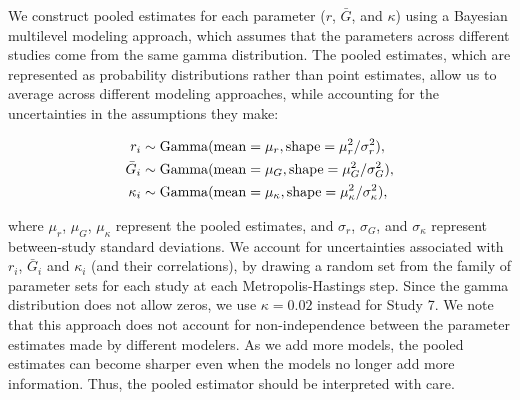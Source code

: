 \documentclass[12pt]{article}
\begin{document}
We construct pooled estimates for each parameter ($r$, $\bar G$, and $\kappa$) using a Bayesian multilevel modeling approach, which assumes that the parameters across different studies come from the same gamma distribution.
The pooled estimates, which are represented as probability distributions rather than point estimates, allow us to average across different modeling approaches, while accounting for the uncertainties in the assumptions they make:
\begin{linenomath*}
\begin{equation}
\begin{aligned}
r_i &\sim \mathrm{Gamma}(\mathrm{mean}=\mu_r, \mathrm{shape}=\mu_r^2/\sigma_r^2),\\
\bar{G}_i &\sim \mathrm{Gamma}(\mathrm{mean}=\mu_G, \mathrm{shape}=\mu_G^2/\sigma_G^2),\\
\kappa_i &\sim \mathrm{Gamma}(\mathrm{mean}=\mu_\kappa, \mathrm{shape}=\mu_\kappa^2/\sigma_\kappa^2),\\
\end{aligned}
\end{equation}
\end{linenomath*}
where $\mu_r$, $\mu_G$, $\mu_\kappa$ represent the pooled estimates, and $\sigma_r$, $\sigma_G$, and $\sigma_\kappa$ represent between-study standard deviations.
We account for uncertainties associated with $r_i$, $\bar G_i$ and $\kappa_i$ (and their correlations), by drawing a random set from the family of parameter sets for each study at each Metropolis-Hastings step.
Since the gamma distribution does not allow zeros, we use $\kappa=0.02$ instead for Study 7.
We note that this approach does not account for non-independence between the parameter estimates made by different modelers.
As we add more models, the pooled estimates can become sharper even when the models no longer add more information.
Thus, the pooled estimator should be interpreted with care.
\end{document}
